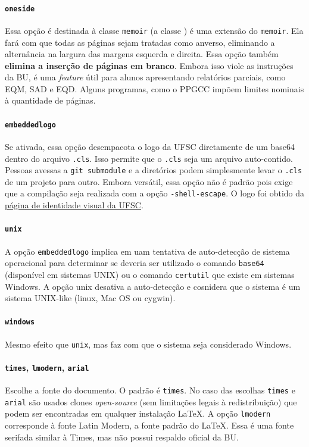\documentclass[embeddedlogo]{../ufsc-thesis-rn46-2019}
\begin{document}
\paragraph*{\texttt{oneside}} Essa opção é destinada à classe \texttt{memoir} (a
classe \abnTeX) é uma extensão do \texttt{memoir}. Ela fará com que todas as
páginas sejam tratadas como anverso, eliminando a alternância na largura das
margens esquerda e direita. Essa opção também \textbf{elimina a inserção de
  páginas em branco}. Embora isso viole as instruções da BU, é uma \emph{feature} útil
para alunos apresentando relatórios parciais, como EQM, SAD e EQD. Alguns
programas, como o PPGCC impõem limites nominais à quantidade de páginas.

\paragraph*{\texttt{embeddedlogo}} Se ativada, essa opção desempacota o logo da
UFSC diretamente de um base64 dentro do arquivo \texttt{.cls}. Isso permite que
o \texttt{.cls} seja um arquivo auto-contido. Pessoas avessas a \texttt{git
  submodule} e a diretórios podem simplesmente levar o \texttt{.cls} de um
projeto para outro. Embora versátil, essa opção não é padrão pois exige que a
compilação seja realizada com a opção \texttt{-shell-escape}. O logo foi obtido
da \href{http://identidade.ufsc.br/}{página de identidade visual da UFSC}. 

\paragraph*{\texttt{unix}} A opção \texttt{embeddedlogo} implica em uam
tentativa de auto-detecção de sistema operacional para determinar se deveria ser
utilizado o comando \texttt{base64} (disponível em sistemas UNIX) ou o comando
\texttt{certutil} que existe em sistemas Windows. A opção unix desativa a
auto-detecção e cosnidera que o sistema é um sistema UNIX-like (linux, Mac OS ou
cygwin).

\paragraph*{\texttt{windows}} Mesmo efeito que \texttt{unix}, mas faz com que o
sistema seja considerado Windows.

\paragraph*{\texttt{times}, \texttt{lmodern}, \texttt{arial}} Escolhe a fonte
do documento. O padrão é \texttt{times}. No caso das escolhas \texttt{times} e
\texttt{arial} são usados clones \emph{open-source} (sem limitações legais à
redistribuição) que podem ser encontradas em qualquer instalação \LaTeX. A
opção \texttt{lmodern} corresponde à fonte Latin Modern, a fonte padrão do
\LaTeX. Essa é uma fonte serifada similar à Times, mas não possui respaldo
oficial da BU.
\end{document}
